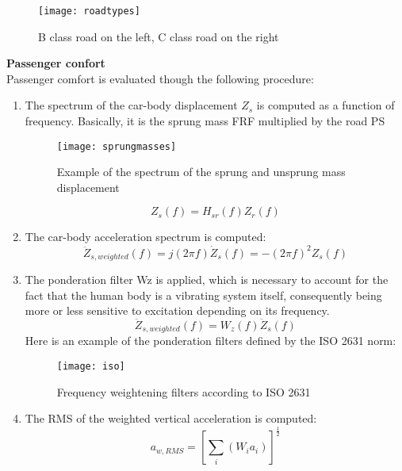 \documentclass{article}
\begin{document}
\begin{figure}[H]
\centering
\texttt{[image: roadtypes]}
\caption{B class road on the left, C class road on the right}
\end{figure} 
\textbf{Passenger confort}\\
Passenger comfort is evaluated though the following procedure: 
\begin{enumerate}
\item The spectrum of the car-body displacement $Z_{s}$ is computed as a function of frequency. Basically, it is the sprung mass FRF multiplied by the road PS
\begin{figure}[H]
\centering
\texttt{[image: sprungmasses]}
\caption{Example of the spectrum of the sprung and unsprung mass displacement}
\end{figure} 
\begin{equation}
Z_{s}(f)=H_{sr}(f)Z_{r}(f)
\end{equation}
\item The car-body acceleration spectrum is computed: 
\begin{equation}
\ddot{Z}_{s,weighted}(f)=j(2\pi f)\dot{Z}_s(f)=-(2\pi f)^{2}Z_s(f)
\end{equation}
\item The ponderation filter Wz is applied, which is necessary to account for the fact that the human body is a vibrating system itself, consequently being more or less sensitive to excitation depending on its frequency.
\begin{equation}
\ddot{Z}_{s,weighted}(f)=W_{z}(f)\ddot{Z}_{s}(f)
\end{equation}
Here is an example of the ponderation filters defined by the ISO 2631 norm: 
\begin{figure}[H]
\centering
\texttt{[image: iso]}
\caption{Frequency weightening filters according to ISO 2631 }
\end{figure}
\item The RMS of the weighted vertical acceleration is computed: 
\begin{equation}
a_{w,RMS}=\left[\sum_{i}(W_{i}a_{i})\right]^{\frac{1}{2}}
\end{equation}
\end{enumerate}
\newpage
\end{document}
